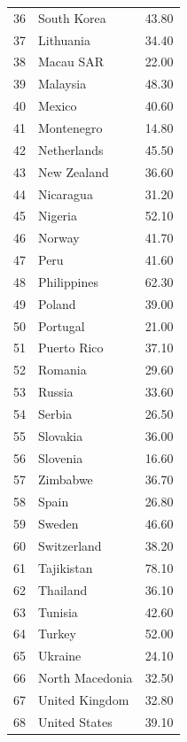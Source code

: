 \documentclass{amsart}
\begin{document}
\begin{table}[ht]
\begin{tabular}{rlr}
  36 & South Korea & 43.80 \\ 
  37 & Lithuania & 34.40 \\ 
  38 & Macau SAR & 22.00 \\ 
  39 & Malaysia & 48.30 \\ 
  40 & Mexico & 40.60 \\ 
  41 & Montenegro & 14.80 \\ 
  42 & Netherlands & 45.50 \\ 
  43 & New Zealand & 36.60 \\ 
  44 & Nicaragua & 31.20 \\ 
  45 & Nigeria & 52.10 \\ 
  46 & Norway & 41.70 \\ 
  47 & Peru & 41.60 \\ 
  48 & Philippines & 62.30 \\ 
  49 & Poland & 39.00 \\ 
  50 & Portugal & 21.00 \\ 
  51 & Puerto Rico & 37.10 \\ 
  52 & Romania & 29.60 \\ 
  53 & Russia & 33.60 \\ 
  54 & Serbia & 26.50 \\ 
  55 & Slovakia & 36.00 \\ 
  56 & Slovenia & 16.60 \\ 
  57 & Zimbabwe & 36.70 \\ 
  58 & Spain & 26.80 \\ 
  59 & Sweden & 46.60 \\ 
  60 & Switzerland & 38.20 \\ 
  61 & Tajikistan & 78.10 \\ 
  62 & Thailand & 36.10 \\ 
  63 & Tunisia & 42.60 \\ 
  64 & Turkey & 52.00 \\ 
  65 & Ukraine & 24.10 \\ 
  66 & North Macedonia & 32.50 \\ 
  67 & United Kingdom & 32.80 \\ 
  68 & United States & 39.10 \\ 
   \hline
\end{tabular}
\end{table}
\end{document}
